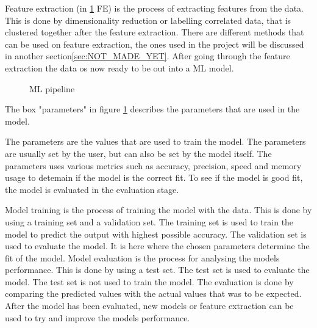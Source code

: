 Feature extraction (in \ref*{fig:ml_pipeline} FE) is the process of extracting features from the data. This is done by dimensionality reduction or labelling correlated data, that is clustered together after the feature extraction. There are different methods that can be used on feature extraction, the ones used in the project will be discussed in another section\ref*{sec:NOT_MADE_YET}. After going through the feature extraction the data os now ready to be out into a ML  model.
\begin{figure}
\centering
{}
\caption{ML pipeline}
\label{fig:ml_pipeline}
\end{figure}

The box "parameters" in figure \ref*{fig:ml_pipeline} describes the parameters that are used in the model. 

The parameters are the values that are used to train the model. The parameters are usually set by the user, but can also be set by the model itself. The parameters uses various metrics such as accuracy, precision, speed and memory usage to detemain if the model is the correct fit. To see if the model is good fit, the model is evaluated in the evaluation stage. 

Model training is the process of training the model with the data. This is done by using a training set and a validation set. The training set is used to train the model to predict the output with highest possible accuracy. The validation set is used to evaluate the model. It is here where the chosen parameters determine the fit of the model. 
Model evaluation is the process for analysing the models performance. This is done by using a test set. The test set is used to evaluate the model. The test set is not used to train the model. The evaluation is done by comparing the predicted values with the actual values that was to be expected. After the model has been evaluated, new models or feature extraction can be used to try and improve the models performance.


\begin{comment}   
@misc{ml_pipeline,
  organization = {javapoint},
  url          = {https://www.javatpoint.com/machine-learning-pipeline},
  title        = {Machine Learning Pipeline},
  urldate      = {2022-10-04}
}
\end{comment}